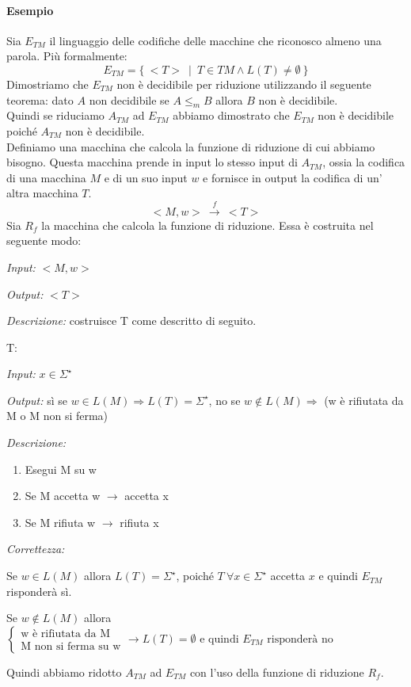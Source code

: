 \paragraph*{Esempio}
Sia $E_{TM}$ il linguaggio delle codifiche delle macchine che riconosco almeno una parola. Più formalmente: 
\[
	E_{TM} = \{ \ <T>  \ \mid \ T  \in TM \land L(T) \not= \emptyset \ \}
\]
Dimostriamo che $E_{TM}$ non è decidibile per riduzione utilizzando il seguente teorema: dato $A$ non decidibile se $A \le_{m} B$ allora $B$ non è decidibile.\\
Quindi se riduciamo $A_{TM}$ ad $E_{TM}$ abbiamo dimostrato che $E_{TM}$ non è decidibile poiché $A_{TM}$ non è decidibile.\\
Definiamo una macchina che calcola la funzione di riduzione di cui abbiamo bisogno. Questa macchina prende in input lo stesso input di $A_{TM}$, ossia la codifica di una macchina $M$ e di un suo input $w$ e fornisce in output la codifica di un' altra macchina $T$.
\[
	<M,w> \ \xrightarrow{f} \ <T>
\]
Sia $R_f$ la macchina che calcola la funzione di riduzione. Essa è costruita nel seguente modo:
\begin{description}
	\item \textit{Input:} $<M,w>$
	\item \textit{Output:} $<T>$
	\item \textit{Descrizione:} costruisce T come descritto di seguito.
\end{description}
T:
\begin{description}
	\item \textit{Input:} $x \in \Sigma^{\star}$
	\item \textit{Output:} s\`i se $w \in L(M) \Rightarrow L(T) = \Sigma^{\star}$, no se $w \notin L(M) \Rightarrow$ (w è rifiutata da M o M non si ferma)
	\item \textit{Descrizione:}
	\begin{enumerate}
		\item Esegui M su w
		\item Se M accetta w $\rightarrow$ accetta x
		\item Se M rifiuta w $\rightarrow$ rifiuta x
	\end{enumerate}
	\item \textit{Correttezza:}
		\item Se $w \in L(M)$ allora $L(T) = \Sigma^{\star}$, poiché $T\ \forall x \in \Sigma^{\star}$ accetta $x$ e quindi $E_{TM}$ risponderà sì.
		\item Se $w \notin L(M)$ allora $
			\begin{cases}
				\text{w è rifiutata da M} \\ \text{M non si ferma su w}
			\end{cases}
			\rightarrow L(T) = \emptyset \text{ e quindi } E_{TM} \text{ risponderà no }$
\end{description}
Quindi abbiamo ridotto $A_{TM}$ ad $E_{TM}$ con l'uso della funzione di riduzione $R_f$.
